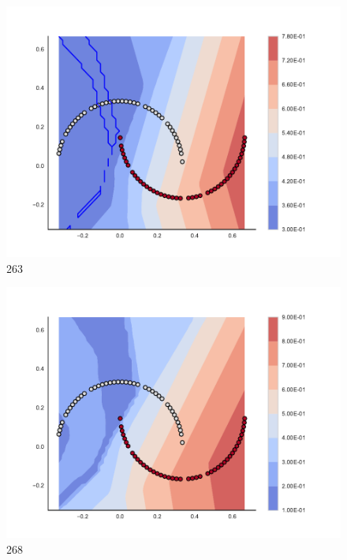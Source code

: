 \begin{subfigure}[b]{0.09\textwidth}
    \includegraphics[clip, trim=2.35cm 1.75cm 4.5cm 0cm,width=\textwidth]{img/convergence/263.pdf}
    \caption{263}
    \label{fig:convergence_263}
\end{subfigure}
%
\begin{subfigure}[b]{0.09\textwidth}
    \includegraphics[clip, trim=2.35cm 1.75cm 4.5cm 0cm,width=\textwidth]{img/convergence/268.pdf}
    \caption{268}
    \label{fig:convergence_268}
\end{subfigure}
%
